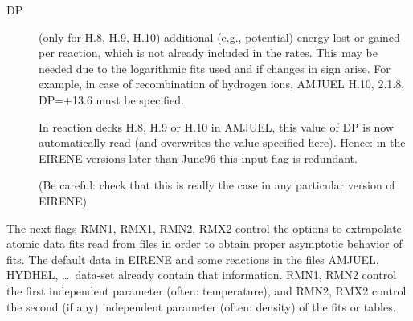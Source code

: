 \medskip

\begin{description}
  \item[DP] (only for H.8, H.9, H.10) additional (e.g., potential) energy lost or
        gained per reaction, which is not already included in the rates.
        This may be needed due to the logarithmic fits used and if changes in sign
        arise.
        For example, in case of recombination of hydrogen ions, AMJUEL H.10, 2.1.8,
        DP=+13.6 must be specified.

        In reaction decks H.8, H.9 or H.10 in AMJUEL, this value of DP is now
        automatically read (and overwrites the value specified here).
        Hence: in the EIRENE versions later than June96 this input flag is redundant.

        (Be careful: check that this is really the case in any particular version of
        EIRENE)

\end{description}
The next flags RMN1, RMX1, RMN2, RMX2 control the options to
extrapolate atomic data fits read from files in order to obtain proper
asymptotic behavior of fits.
The default data in EIRENE and some reactions in the files AMJUEL, HYDHEL,
\dots\ data-set already contain that information.
RMN1, RMN2 control the first independent parameter (often: temperature), and
RMN2, RMX2 control the second (if any) independent parameter (often: density)
of the fits or tables.

